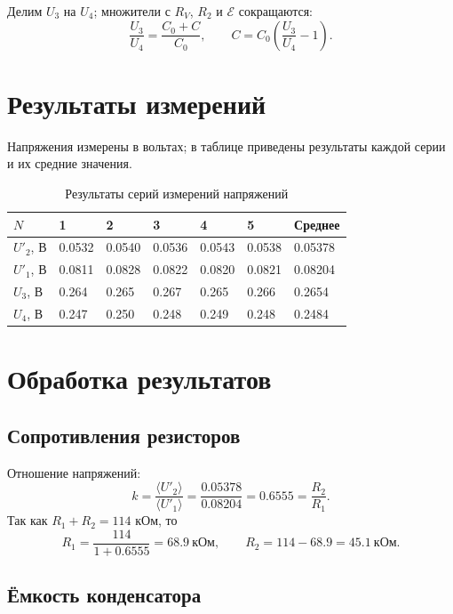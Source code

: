 \documentclass[12pt]{article}
\begin{document}
    Делим $U_3$ на $U_4$; множители с $R_V$, $R_2$ и $\mathcal{E}$ сокращаются:
    \[
        \frac{U_3}{U_4} = \frac{C_0 + C}{C_0}, \qquad C = C_0\left(\frac{U_3}{U_4} - 1\right).
    \]

    \section{Результаты измерений}

    Напряжения измерены в вольтах; в таблице приведены результаты каждой серии и их средние значения.

    \begin{table}[H]
        \centering
        \begin{xltabular}{\textwidth}{@{}lXXXXXX@{}}
            \toprule
            $N$ & 1 & 2 & 3 & 4 & 5 & Среднее\\
            \midrule
            $U'_2$, В & 0.0532 & 0.0540 & 0.0536 & 0.0543 & 0.0538 & 0.05378\\
            $U'_1$, В & 0.0811 & 0.0828 & 0.0822 & 0.0820 & 0.0821 & 0.08204\\
            $U_3$, В  & 0.264  & 0.265  & 0.267  & 0.265  & 0.266  & 0.2654\\
            $U_4$, В  & 0.247  & 0.250  & 0.248  & 0.249  & 0.248  & 0.2484\\
            \bottomrule
        \end{xltabular}
        \caption{Результаты серий измерений напряжений}
        \label{tab:data}
    \end{table}

    \section{Обработка результатов}

    \subsection{Сопротивления резисторов}

    Отношение напряжений:
    \[
        k = \frac{\langle U'_2 \rangle}{\langle U'_1 \rangle} = \frac{0.05378}{0.08204} = 0.6555 = \frac{R_2}{R_1}.
    \]
    Так как $R_1 + R_2 = 114$ кОм, то
    \[
        R_1 = \frac{114}{1 + 0.6555} = 68.9 \ \text{кОм}, \qquad R_2 = 114 - 68.9 = 45.1 \ \text{кОм}.
    \]

    \subsection{Ёмкость конденсатора}
\end{document}
